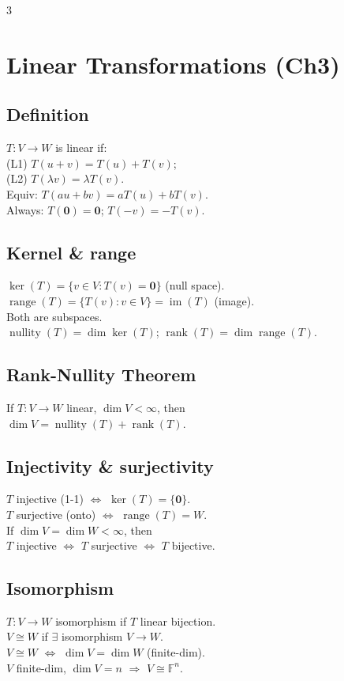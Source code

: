 \documentclass[10pt]{article}
\newcommand{\F}{\mathbb{F}}
\newcommand{\rank}{\operatorname{rank}}
\newcommand{\nullity}{\operatorname{nullity}}
\newcommand{\Ker}{\operatorname{ker}}
\newcommand{\Range}{\operatorname{range}}
\newcommand{\im}{\operatorname{im}}
\begin{document}
\begin{multicols}{3}
\section*{Linear Transformations (Ch3)}

\subsection*{Definition}
$T:V\to W$ is linear if:\\
(L1) $T(u+v)=T(u)+T(v)$;\\
(L2) $T(\lambda v)=\lambda T(v)$.\\
Equiv: $T(au+bv)=aT(u)+bT(v)$.\\
Always: $T(\bm{0})=\bm{0}$; $T(-v)=-T(v)$.

\subsection*{Kernel \& range}
$\Ker(T)=\{v\in V:T(v)=\bm{0}\}$ (null space).\\
$\Range(T)=\{T(v):v\in V\}=\im(T)$ (image).\\
Both are subspaces.\\
$\nullity(T)=\dim\Ker(T)$; $\rank(T)=\dim\Range(T)$.

\subsection*{Rank-Nullity Theorem}
If $T:V\to W$ linear, $\dim V<\infty$, then\\
$\dim V=\nullity(T)+\rank(T)$.

\subsection*{Injectivity \& surjectivity}
$T$ injective (1-1) $\Leftrightarrow$ $\Ker(T)=\{\bm{0}\}$.\\
$T$ surjective (onto) $\Leftrightarrow$ $\Range(T)=W$.\\
If $\dim V=\dim W<\infty$, then\\
\quad $T$ injective $\Leftrightarrow$ $T$ surjective $\Leftrightarrow$ $T$ bijective.

\subsection*{Isomorphism}
$T:V\to W$ isomorphism if $T$ linear bijection.\\
$V\cong W$ if $\exists$ isomorphism $V\to W$.\\
$V\cong W$ $\Leftrightarrow$ $\dim V=\dim W$ (finite-dim).\\
$V$ finite-dim, $\dim V=n$ $\Rightarrow$ $V\cong\F^n$.


\end{multicols}
\end{document}
